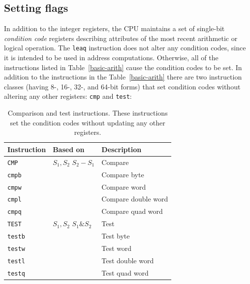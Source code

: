 \documentclass{article}
\begin{document}
\subsection{Setting flags}
In addition to the integer registers, the CPU maintains a set of single-bit \textit{condition code} registers describing attributes of the most recent arithmetic or logical operation.
The \texttt{leaq} instruction does not alter any condition codes, since it is intended to be used in address computations. Otherwise, all of the instructions listed in Table~\ref{basic-arith} cause the condition codes to be set.
In addition to the instructions in the Table~\ref{basic-arith} there are two instruction classes (having 8-, 16-, 32-, and 64-bit forms) that set condition codes without altering any other registers: \texttt{cmp} and \texttt{test}:
\begin{table}[h]
    \centering
    \begin{tabular}{lll}
        \toprule
        \textbf{Instruction} & \textbf{Based on} & \textbf{Description} \\
        \midrule
        \texttt{CMP}  & $S_1, S_2$ \quad $S_2 - S_1$ & Compare \\
        \quad \texttt{cmpb} & & Compare byte \\
        \quad \texttt{cmpw} & & Compare word \\
        \quad \texttt{cmpl} & & Compare double word \\
        \quad \texttt{cmpq} & & Compare quad word \\
        \midrule
        \texttt{TEST} & $S_1, S_2$ \quad $S_1 \& S_2$ & Test \\
        \quad \texttt{testb} & & Test byte \\
        \quad \texttt{testw} & & Test word \\
        \quad \texttt{testl} & & Test double word \\
        \quad \texttt{testq} & & Test quad word \\
        \bottomrule
    \end{tabular}
    \caption{Comparison and test instructions. These instructions set the condition codes without updating any other registers.}
    \label{tab:cmp_test_instructions}
\end{table}
\end{document}
